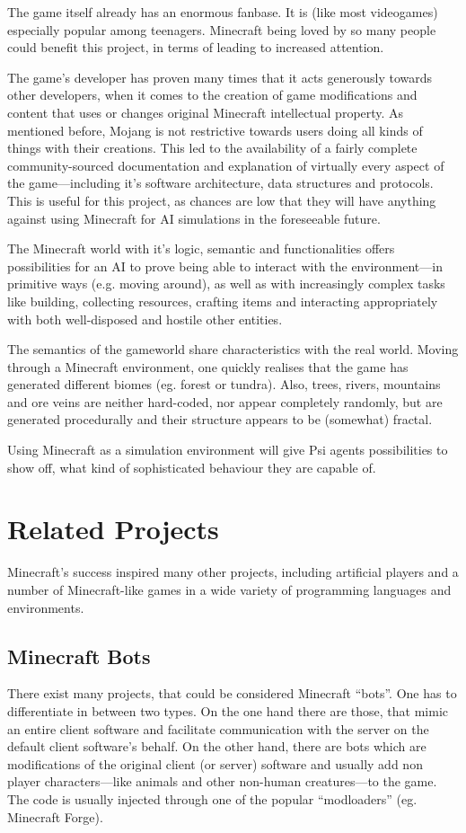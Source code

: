 The game itself already has an enormous fanbase. It is (like most videogames) especially popular among teenagers. Minecraft being loved by so many people could benefit this project, in terms of leading to increased attention.

The game's developer has proven many times that it acts generously towards  other developers, when it comes to the creation of game modifications and content that uses or changes original Minecraft intellectual property. As mentioned before, Mojang is not restrictive towards users doing all kinds of things with their creations. This led to the availability of a fairly complete community-sourced  documentation and explanation of virtually every aspect of the game---including it's software architecture, data structures and protocols. This is useful for this project, as chances are low that they will have anything against using Minecraft for AI simulations in the foreseeable future. %

The Minecraft world with it's logic, semantic and functionalities offers possibilities for an AI to prove being able to interact with the environment---in primitive ways (e.g. moving around), as well as with increasingly complex tasks like building, collecting resources, crafting items and interacting appropriately with both well-disposed and hostile other entities.

The semantics of the gameworld share characteristics with the real world. Moving through a Minecraft environment, one quickly realises that the game has generated different biomes (eg. forest or tundra). Also, trees, rivers, mountains and ore veins are neither hard-coded, nor appear completely randomly, but are generated procedurally and their structure appears to be (somewhat) fractal.
        
Using Minecraft as a simulation environment will give Psi agents possibilities to show off, what kind of sophisticated behaviour they are capable of.

    \section{Related Projects}
Minecraft's success inspired many other projects, including artificial players and a number of Minecraft-like games in a wide variety of programming languages and environments.


        \subsection{Minecraft Bots}
There exist many projects, that could be considered Minecraft ``bots''. One has to differentiate in between two types. On the one hand there are those, that mimic an entire client software and facilitate communication with the server on the default client software's behalf. On the other hand, there are bots which are modifications of the original client (or server) software and usually add non player characters---like animals and other non-human creatures---to the game. The code is usually injected through one of the popular ``modloaders'' (eg. Minecraft Forge).

